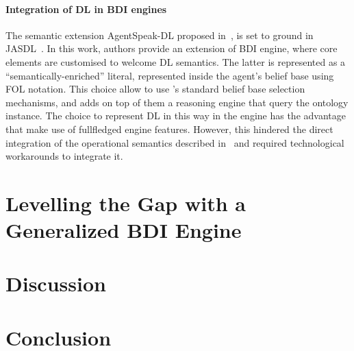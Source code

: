 \documentclass[
]{ceurart}
\begin{document}
\paragraph{Integration of DL in BDI engines}
The semantic extension AgentSpeak-DL proposed in~\cite{DBLP:conf/dalt/MoreiraVBH05}, 
is set to ground in JASDL~\cite{DBLP:conf/dalt/KlapiscakB08}.
%
In this work, 
authors provide an extension of \jason{} \ac{BDI} engine, 
where core elements are customised to welcome \ac{DL} semantics.
%
The latter is represented as a ``semantically-enriched'' literal,
represented inside the agent's belief base using FOL notation.
%
This choice allow to use \jason{}'s standard belief base selection mechanisms, 
and adds on top of them a reasoning engine that query the ontology instance.
%
The choice to represent \ac{DL} in this way in the engine has the advantage that make use of fullfledged \jason{} engine features.
%
However, 
this hindered the direct integration of the operational semantics described in~\cite{DBLP:conf/dalt/KlapiscakB08} 
and required technological workarounds to integrate it.
%


\section{Levelling the Gap with a Generalized BDI Engine}
\label{sec:generalized-bdi-engine}



\section{Discussion}
\label{sec:discussion}


\section{Conclusion}
\label{sec:conclusion}
\end{document}
